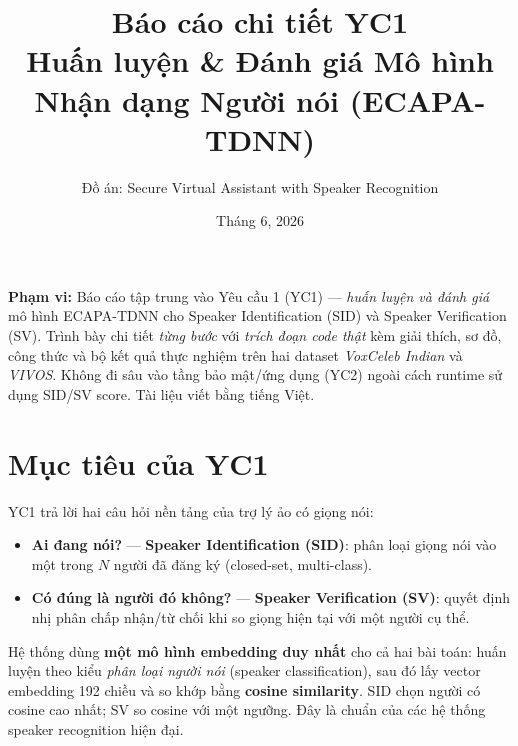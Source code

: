 \documentclass[12pt,a4paper]{article}
\title{\textbf{Báo cáo chi tiết YC1}\\[4pt]
\large Huấn luyện \& Đánh giá Mô hình Nhận dạng Người nói (ECAPA-TDNN)}
\author{Đồ án: Secure Virtual Assistant with Speaker Recognition}
\date{Tháng 6, 2026}
\begin{document}
\maketitle

\begin{tcolorbox}[enhanced,colback=blue!3,colframe=blue!40!black,arc=3pt,
  boxrule=0.5pt,left=6pt,right=6pt]
\textbf{Phạm vi:} Báo cáo tập trung vào Yêu cầu 1 (YC1) --- \emph{huấn luyện và
đánh giá} mô hình ECAPA-TDNN cho Speaker Identification (SID) và Speaker
Verification (SV). Trình bày chi tiết \emph{từng bước} với \emph{trích đoạn code
thật} kèm giải thích, sơ đồ, công thức và bộ kết quả thực nghiệm trên hai dataset
\emph{VoxCeleb Indian} và \emph{VIVOS}. Không đi sâu vào tầng bảo mật/ứng dụng
(YC2) ngoài cách runtime sử dụng SID/SV score. Tài liệu viết bằng tiếng Việt.
\end{tcolorbox}

\tableofcontents
\newpage

\section{Mục tiêu của YC1}
YC1 trả lời hai câu hỏi nền tảng của trợ lý ảo có giọng nói:

\begin{itemize}
  \item \textbf{Ai đang nói?} --- \textbf{Speaker Identification (SID)}: phân loại
  giọng nói vào một trong $N$ người đã đăng ký (closed-set, multi-class).
  \item \textbf{Có đúng là người đó không?} --- \textbf{Speaker Verification (SV)}:
  quyết định nhị phân chấp nhận/từ chối khi so giọng hiện tại với một người cụ thể.
\end{itemize}

\begin{diembox}
Hệ thống dùng \textbf{một mô hình embedding duy nhất} cho cả hai bài toán: huấn
luyện theo kiểu \emph{phân loại người nói} (speaker classification), sau đó lấy
vector embedding 192 chiều và so khớp bằng \textbf{cosine similarity}. SID chọn
người có cosine cao nhất; SV so cosine với một ngưỡng. Đây là chuẩn của các hệ
thống speaker recognition hiện đại.
\end{diembox}

\end{document}
